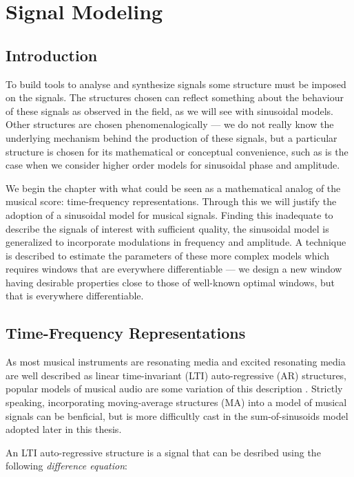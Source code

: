 \chapter{Signal Modeling}

\section{Introduction}

To build tools to analyse and synthesize signals some structure must be imposed
on the signals. The structures chosen can reflect something about the behaviour
of these signals as observed in the field, as we will see with sinusoidal
models. Other structures are chosen phenomenalogically --- we do not really know
the underlying mechanism behind the production of these signals, but a
particular structure is chosen for its mathematical or conceptual convenience,
such as is the case when we consider higher order models for sinusoidal phase
and amplitude.

We begin the chapter with what could be seen as a mathematical analog of the
musical score: time-frequency representations. Through this we will justify the
adoption of a sinusoidal model for musical signals. Finding this inadequate to
describe the signals of interest with sufficient quality, the sinusoidal model
is generalized to incorporate modulations in frequency and amplitude. A
technique is described to estimate the parameters of these more complex models
which requires windows that are everywhere differentiable --- we design a new
window having desirable properties close to those of well-known optimal windows,
but that is everywhere differentiable.

\section{Time-Frequency Representations \label{sec:timefreqrep}}

As most musical instruments are resonating media and excited resonating media
are well described as linear time-invariant (LTI) auto-regressive (AR)
structures, popular models of musical audio are some variation of this
description \cite{fletcher2012physics}. Strictly speaking, incorporating
moving-average structures (MA) into a model of musical signals can be benficial,
but is more difficultly cast in the sum-of-sinusoids model adopted later in this
thesis.

An LTI auto-regressive structure is a signal that can be desribed using the
following \textit{difference equation}:


